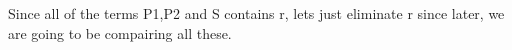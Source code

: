 \documentclass[preview]{standalone}
\begin{document}
\begin{center}
Since all of the terms P1,P2 and S contains r, lets just eliminate r since later, we are going to be compairing all these.
\end{center}
\end{document}
